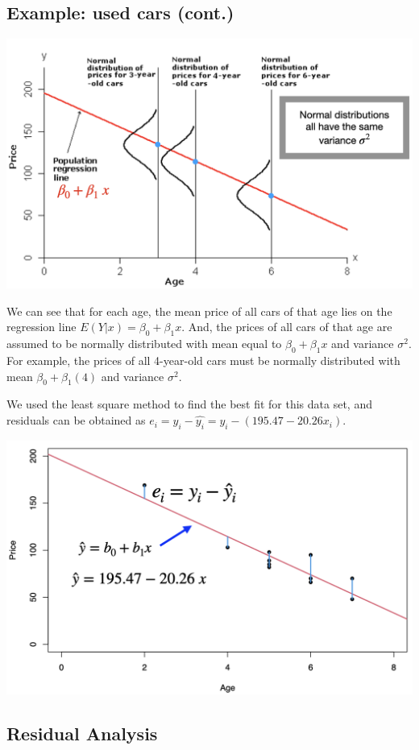 \documentclass[
]{article}
\begin{document}
\hypertarget{example-used-cars-cont.-2}{%
\subsection{Example: used cars
(cont.)}\label{example-used-cars-cont.-2}}

\begin{center}\includegraphics[width=0.6\linewidth,height=0.6\textheight]{figures/ass2} \end{center}

We can see that for each age, the mean price of all cars of that age
lies on the regression line \(E(Y|x)=\beta_0+\beta_1x\). And, the prices
of all cars of that age are assumed to be normally distributed with mean
equal to \(\beta_0+\beta_1 x\) and variance \(\sigma^2\). For example,
the prices of all 4-year-old cars must be normally distributed with mean
\(\beta_0+\beta_1 (4)\) and variance \(\sigma^2\).

We used the least square method to find the best fit for this data set,
and residuals can be obtained as
\(e_i=y_i-\hat{y_i}= y_i-(195.47 -20.26x_i)\).

\begin{center}\includegraphics[width=0.6\linewidth,height=0.6\textheight]{figures/ass3} \end{center}

\hypertarget{residual-analysis}{%
\subsection{Residual Analysis}\label{residual-analysis}}
\end{document}
